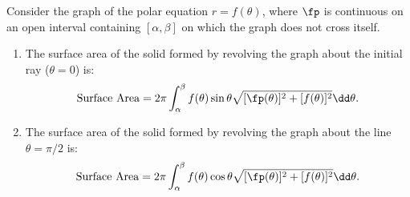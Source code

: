\begin{keyidea}\label{idea:surface_area_polar}%
Consider the graph of the polar equation $r=f(\theta)$, where $\fp$ is continuous on an open interval containing $[\alpha,\beta]$ on which the graph does not cross itself.
\begin{enumerate}
	\item The surface area of the solid formed by revolving the graph about the initial ray ($\theta=0$) is:
	\[\text{Surface Area} = 2\pi\int_\alpha^\beta f(\theta)\sin\theta\sqrt{[\fp(\theta)]^2+[f(\theta)]^2}\dd\theta.\]
	\item The surface area of the solid formed by revolving the graph about the line $\theta=\pi/2$ is:
	\[\text{Surface Area} = 2\pi\int_\alpha^\beta f(\theta)\cos\theta\sqrt{[\fp(\theta)]^2+[f(\theta)]^2}\dd\theta.\]
\end{enumerate}
\end{keyidea}

